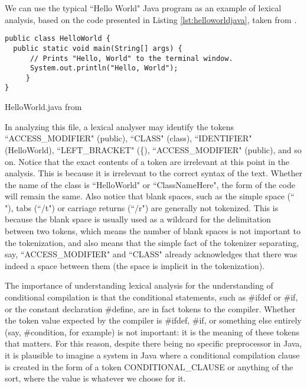 We can use the typical ``Hello World" Java program as an example of lexical analysis, based on the code presented in Listing \ref{lst:helloworldjava}, taken from \cite{SEDGEWICK:2011}.

\begin{listing}
\begin{verbatim}
public class HelloWorld {
  public static void main(String[] args) {
      // Prints "Hello, World" to the terminal window.
      System.out.println("Hello, World");
     }
}
\end{verbatim}
\caption{HelloWorld.java from \cite{SEDGEWICK:2011}} \label{lst:helloworldjava}
\end{listing}

In analyzing this file, a lexical analyser may identify the tokens ``ACCESS_MODIFIER" (public), ``CLASS" (class), ``IDENTIFIER" (HelloWorld), ``LEFT_BRACKET" (\{), ``ACCESS_MODIFIER" (public), and so on. Notice that the exact contents of a token are irrelevant at this point in the analysis. This is because it is irrelevant to the correct syntax of the text. Whether the name of the class is ``HelloWorld" or ``ClassNameHere", the form of the code will remain the same. Also notice that blank spaces, such as the simple space (`` "), tabs (``/t") or carriage returns (``/r") are generally not tokenized. This is because the blank space is usually used as a wildcard for the delimitation between two tokens, which means the number of blank spaces is not important to the tokenization, and also means that the simple fact of the tokenizer separating, say, ``ACCESS_MODIFIER" and ``CLASS" already acknowledges that there was indeed a space between them (the space is implicit in the tokenization).

The importance of understanding lexical analysis for the understanding of conditional compilation is that the conditional statements, such as \#ifdef or \#if, or the constant declaration \#define, are in fact tokens to the compiler. Whether the token value expected by the compiler is \#ifdef, \#if, or something else entirely (say, \#condition, for example) is not important: it is the meaning of these tokens that matters. For this reason, despite there being no specific preprocessor in Java, it is plausible to imagine a system in Java where a conditional compilation clause is created in the form of a token CONDITIONAL_CLAUSE or anything of the sort, where the value is whatever we choose for it.

